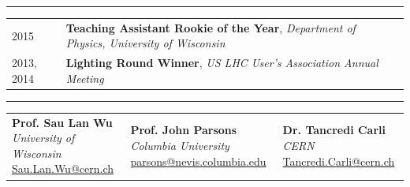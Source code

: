 \documentclass{letter}
\begin{document}
\vspace{-10pt}

\begin{flushleft}
\Large{\textsc{\textbf{\color{Maroon}{Awards}}}}
\vspace{1pt} %
\hrule
\end{flushleft}

\begin{tabular}{p{}p{}}
	2015
	&
	\textbf{Teaching Assistant Rookie of the Year}, \textit{Department of Physics, University of Wisconsin} 
\\
	2013, 2014
	& 
	\textbf{Lighting Round Winner}, \textit{US LHC User's Association Annual Meeting}
\\
\end{tabular}

\begin{flushleft}
\Large{\textsc{\textbf{\color{Maroon}{References}}}}
\hrule
\end{flushleft}

\begin{tabular}{p{}p{}p{}}
	\textbf{Prof. Sau Lan Wu} \newline
	\textit{University of Wisconsin} \newline
	\href{mailto:Sau.Lan.Wu@cern.ch}{Sau.Lan.Wu@cern.ch}
	&
	\textbf{Prof. John Parsons} \newline
	\textit{Columbia University} \newline
	\href{mailto:parsons@nevis.columbia.edu}{parsons@nevis.columbia.edu}
	&
	\textbf{Dr. Tancredi Carli} \newline
	\textit{CERN} \newline
	\href{mailto:Tancredi.Carli@cern.ch}{Tancredi.Carli@cern.ch}
\end{tabular}
\end{document}
